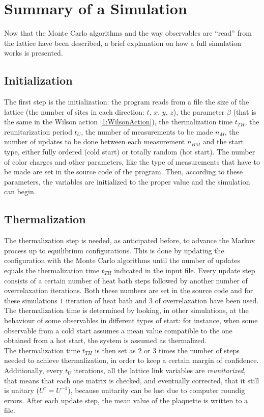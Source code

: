 \section{Summary of a Simulation}
Now that the Monte Carlo algorithms and the way observables are ``read'' from the lattice have been described, a brief explanation on how a full simulation works is presented.

\subsection{Initialization}
The first step is the initialization: the program reads from a file the size of the lattice (the number of sites in each direction: $t$, $x$, $y$, $z$), the parameter $\beta$ (that is the same in the Wilson action \eqref{1:WilsonAction}), the thermalization time $t_{TH}$, the reunitarization period $t_U$, the number of measurements to be made $n_M$, the number of updates to be done between each measurement $n_{BM}$ and the start type, either fully ordered (cold start) or totally random (hot start).
The number of color charges and other parameters, like the type of measurements that have to be made are set in the source code of the program.
Then, according to these parameters, the variables are initialized to the proper value and the simulation can begin.

\subsection{Thermalization}
The thermalization step is needed, as anticipated before, to advance the Markov process up to equilibrium configurations.
This is done by updating the configuration with the Monte Carlo algorithms until the number of updates equals the thermalization time $t_{TH}$ indicated in the input file.
Every update step consists of a certain number of heat bath steps followed by another number of overrelaxation iterations.
Both these numbers are set in the source code and for these simulations $1$ iteration of heat bath and $3$ of overrelaxation have been used.\\
The thermalization time is determined by looking, in other simulations, at the behaviour of some observables in different types of start: for instance, when some observable from a cold start assumes a mean value compatible to the one obtained from a hot start, the system is assumed as thermalized.\\
The thermalization time $t_{TH}$ is then set as $2$ or $3$ times the number of steps needed to achieve thermalization, in order to keep a certain margin of confidence.\\
Additionally, every $t_U$ iterations, all the lattice link variables are \emph{reunitarized}, that means that each one matrix is checked, and eventually corrected, that it still is unitary (\ie $U^\dagger=U^{-1}$), because unitarity can be lost due to computer roundig errors.
After each update step, the mean value of the plaquette is written to a file.

